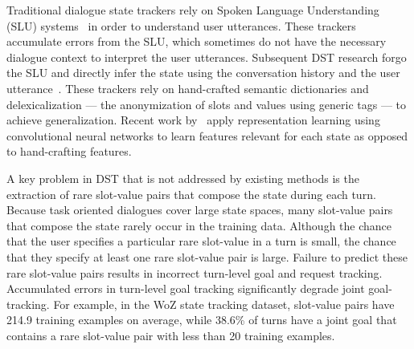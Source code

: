 \documentclass[11pt,a4paper]{article}
\begin{document}


Traditional dialogue state trackers rely on Spoken Language Understanding (SLU) systems~\cite{henderson2012discriminative} in order to understand user utterances.
These trackers accumulate errors from the SLU, which sometimes do not have the necessary dialogue context to interpret the user utterances.
Subsequent DST research forgo the SLU and directly infer the state using the conversation history and the user utterance~\cite{henderson2014word,zilka2015incremental,mrkvsic2015multi}.
These trackers rely on hand-crafted semantic dictionaries and delexicalization --- the anonymization of slots and values using generic tags --- to achieve generalization.
Recent work by~\citet{mrkvsic2016neural} apply representation learning using convolutional neural networks to learn features relevant for each state as opposed to hand-crafting features.





A key problem in DST that is not addressed by existing methods is the extraction of rare slot-value pairs that compose the state during each turn.
Because task oriented dialogues cover large state spaces, many slot-value pairs that compose the state rarely occur in the training data.
Although the chance that the user specifies a particular rare slot-value in a turn is small, the chance that they specify at least one rare slot-value pair is large.
Failure to predict these rare slot-value pairs results in incorrect turn-level goal and request tracking.
Accumulated errors in turn-level goal tracking significantly degrade joint goal-tracking.
For example, in the WoZ state tracking dataset, slot-value pairs have 214.9 training examples on average, while 38.6\% of turns have a joint goal that contains a rare slot-value pair with less than 20 training examples.
\end{document}
